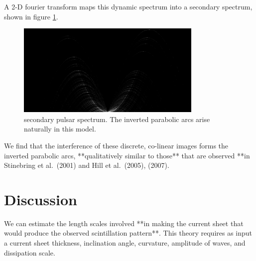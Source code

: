 \documentclass[useAMS,usenatbib]{mn2e}
\begin{document}
A 2-D fourier transform maps this dynamic spectrum into a secondary
spectrum, shown in figure \ref{fig:ss}.

\begin{figure}
\centerline{\includegraphics[width=3.5in]{sspect.jpg}}
\caption{secondary pulsar spectrum.  The inverted parabolic arcs arise
naturally in this model.}
\label{fig:ss}
\end{figure}

We find that the interference of these discrete, co-linear images
forms the inverted parabolic arcs, **qualitatively similar to those** that are observed **in
Stinebring et al.~(2001) and Hill et al.~(2005), (2007).



\section{Discussion}

We can estimate the length scales involved **in making the current sheet that
would produce the observed scintillation pattern**.  This theory requires as
input a current sheet thickness, inclination angle, curvature,
amplitude of waves, and dissipation scale.
\end{document}
